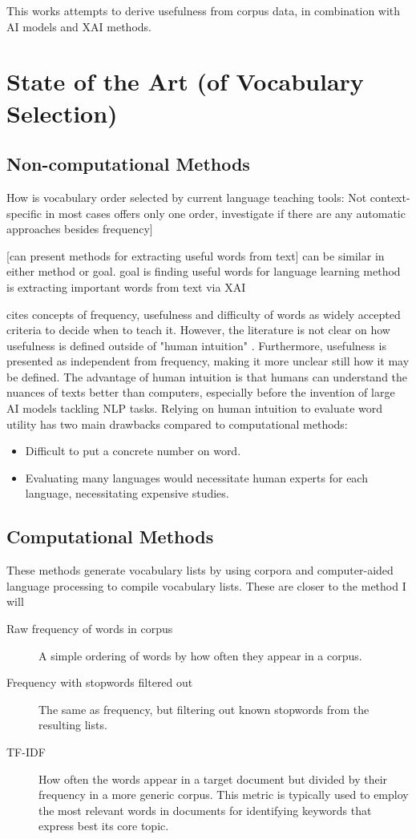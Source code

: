 This works attempts to derive usefulness from corpus data, in combination with AI models and XAI methods.



\section{State of the Art (of Vocabulary Selection)}
\subsection{Non-computational Methods}
How is vocabulary order selected by current language teaching tools:
Not context-specific in most cases
offers only one order,
investigate if there are any automatic approaches besides frequency]

[can present methods for extracting useful words from text]
can be similar in either method or goal.
goal is finding useful words for language learning
method is extracting important words from text via XAI

\cite{heChoosingWordsTeach2019} cites concepts of frequency, usefulness and difficulty of words as widely accepted criteria to decide when to teach it.
However, the literature is not clear on how usefulness is defined outside of "human intuition" \cite{heChoosingWordsTeach2019}.
Furthermore, usefulness is presented as independent from frequency, making it more unclear still how it may be defined.
The advantage of human intuition is that humans can understand the nuances of texts better than computers, especially before the invention of large AI models tackling NLP tasks.
Relying on human intuition to evaluate word utility has two main drawbacks compared to computational methods:
\begin{itemize}
	\item Difficult to put a concrete number on word.
	\item Evaluating many languages would necessitate human experts for each language, necessitating expensive studies.
\end{itemize}

\subsection{Computational Methods}
These methods generate vocabulary lists by using corpora and computer-aided language processing to compile vocabulary lists.
These are closer to the method I will

\begin{description}
	\item [Raw frequency of words in corpus]
	      A simple ordering of words by how often they appear in a corpus.
	\item [Frequency with stopwords filtered out]
	      The same as frequency, but filtering out known stopwords from the resulting lists.
	\item [TF-IDF]
	      How often the words appear in a target document but divided by their frequency in a more generic corpus.
	      This metric is typically used to employ the most relevant words in documents for identifying keywords that express best its core topic.
\end{description}

